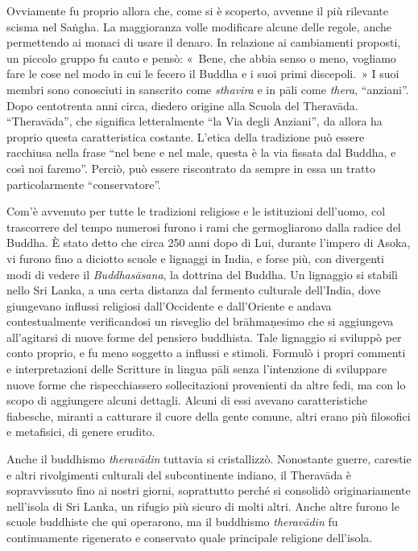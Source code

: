 Ovviamente fu proprio allora che, come si è scoperto, avvenne il più
rilevante scisma nel Saṅgha. La maggioranza volle modificare alcune
delle regole, anche permettendo ai monaci di usare il denaro. In
relazione ai cambiamenti proposti, un piccolo gruppo fu cauto e pensò:
«~Bene, che abbia senso o meno, vogliamo fare le cose nel modo in cui le
fecero il Buddha e i suoi primi discepoli.~» I suoi membri sono
conosciuti in sanscrito come \emph{sthavira} e in pāli come
\emph{thera}, ``anziani''. Dopo centotrenta anni circa, diedero origine
alla Scuola del Theravāda. ``Theravāda'', che significa letteralmente
``la Via degli Anziani'', da allora ha proprio questa caratteristica
costante. L'etica della tradizione può essere racchiusa nella frase
``nel bene e nel male, questa è la via fissata dal Buddha, e così noi
faremo''. Perciò, può essere riscontrato da sempre in essa un tratto
particolarmente ``conservatore''.

Com'è avvenuto per tutte le tradizioni religiose e le istituzioni
dell'uomo, col trascorrere del tempo numerosi furono i rami che
germogliarono dalla radice del Buddha. È stato detto che circa 250 anni
dopo di Lui, durante l'impero di Asoka, vi furono fino a diciotto scuole
e lignaggi in India, e forse più, con divergenti modi di vedere il
\emph{Buddhasāsana}, la dottrina del Buddha. Un lignaggio si stabilì
nello Sri Lanka, a una certa distanza dal fermento culturale dell'India,
dove giungevano influssi religiosi dall'Occidente e dall'Oriente e
andava contestualmente verificandosi un risveglio del brāhmaṇesimo che
si aggiungeva all'agitarsi di nuove forme del pensiero buddhista. Tale
lignaggio si sviluppò per conto proprio, e fu meno soggetto a influssi e
stimoli. Formulò i propri commenti e interpretazioni delle Scritture in
lingua pāli senza l'intenzione di sviluppare nuove forme che
rispecchiassero sollecitazioni provenienti da altre fedi, ma con lo
scopo di aggiungere alcuni dettagli. Alcuni di essi avevano
caratteristiche fiabesche, miranti a catturare il cuore della gente
comune, altri erano più filosofici e metafisici, di genere erudito.

Anche il buddhismo \emph{theravādin} tuttavia si cristallizzò.
Nonostante guerre, carestie e altri rivolgimenti culturali del
subcontinente indiano, il Theravāda è sopravvissuto fino ai nostri
giorni, soprattutto perché si consolidò originariamente nell'isola di
Sri Lanka, un rifugio più sicuro di molti altri. Anche altre furono le
scuole buddhiste che qui operarono, ma il buddhismo \emph{theravādin} fu
continuamente rigenerato e conservato quale principale religione
dell'isola.

